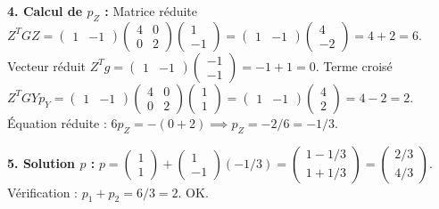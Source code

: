 \begin{correction}
\textbf{4. Calcul de $p_Z$ :}
Matrice réduite $Z^T G Z = \begin{pmatrix} 1 & -1 \end{pmatrix} \begin{pmatrix} 4 & 0 \\ 0 & 2 \end{pmatrix} \begin{pmatrix} 1 \\ -1 \end{pmatrix} = \begin{pmatrix} 1 & -1 \end{pmatrix} \begin{pmatrix} 4 \\ -2 \end{pmatrix} = 4 + 2 = 6$.
Vecteur réduit $Z^T g = \begin{pmatrix} 1 & -1 \end{pmatrix} \begin{pmatrix} -1 \\ -1 \end{pmatrix} = -1 + 1 = 0$.
Terme croisé $Z^T G Y p_Y = \begin{pmatrix} 1 & -1 \end{pmatrix} \begin{pmatrix} 4 & 0 \\ 0 & 2 \end{pmatrix} \begin{pmatrix} 1 \\ 1 \end{pmatrix} = \begin{pmatrix} 1 & -1 \end{pmatrix} \begin{pmatrix} 4 \\ 2 \end{pmatrix} = 4 - 2 = 2$.
Équation réduite : $6 p_Z = -(0 + 2) \implies p_Z = -2/6 = -1/3$.

\textbf{5. Solution $p$ :}
$p = \begin{pmatrix} 1 \\ 1 \end{pmatrix} + \begin{pmatrix} 1 \\ -1 \end{pmatrix} (-1/3) = \begin{pmatrix} 1 - 1/3 \\ 1 + 1/3 \end{pmatrix} = \begin{pmatrix} 2/3 \\ 4/3 \end{pmatrix}$.
Vérification : $p_1 + p_2 = 6/3 = 2$. OK.
\end{correction}
\bigskip

